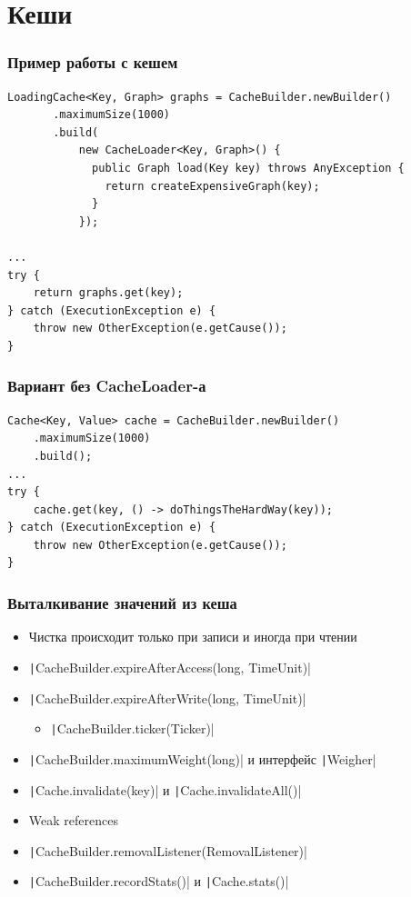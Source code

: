 \documentclass[xetex,mathserif,serif]{beamer}
\begin{document}
	\section{Кеши}

	\begin{frame}[fragile]
		\frametitle{Пример работы с кешем}
		\begin{verbatim}
LoadingCache<Key, Graph> graphs = CacheBuilder.newBuilder()
       .maximumSize(1000)
       .build(
           new CacheLoader<Key, Graph>() {
             public Graph load(Key key) throws AnyException {
               return createExpensiveGraph(key);
             }
           });

...
try {
    return graphs.get(key);
} catch (ExecutionException e) {
    throw new OtherException(e.getCause());
}
		\end{verbatim}
\end{frame}

	\begin{frame}[fragile]
		\frametitle{Вариант без CacheLoader-а}
		\begin{verbatim}
Cache<Key, Value> cache = CacheBuilder.newBuilder()
    .maximumSize(1000)
    .build(); 
...
try {
    cache.get(key, () -> doThingsTheHardWay(key));
} catch (ExecutionException e) {
    throw new OtherException(e.getCause());
}
		\end{verbatim}
\end{frame}

	\begin{frame}
		\frametitle{Выталкивание значений из кеша}
		\begin{itemize}
			\item Чистка происходит только при записи и иногда при чтении
			\item \texttt|CacheBuilder.expireAfterAccess(long, TimeUnit)|
			\item \texttt|CacheBuilder.expireAfterWrite(long, TimeUnit)|
			\begin{itemize}
				\item \texttt|CacheBuilder.ticker(Ticker)|
			\end{itemize}
			\item \texttt|CacheBuilder.maximumWeight(long)| и интерфейс \texttt|Weigher|
			\item \texttt|Cache.invalidate(key)| и \texttt|Cache.invalidateAll()|
			\item Weak references
			\item \texttt|CacheBuilder.removalListener(RemovalListener)|
			\item \texttt|CacheBuilder.recordStats()| и \texttt|Cache.stats()|
		\end{itemize}
	\end{frame}
\end{document}
